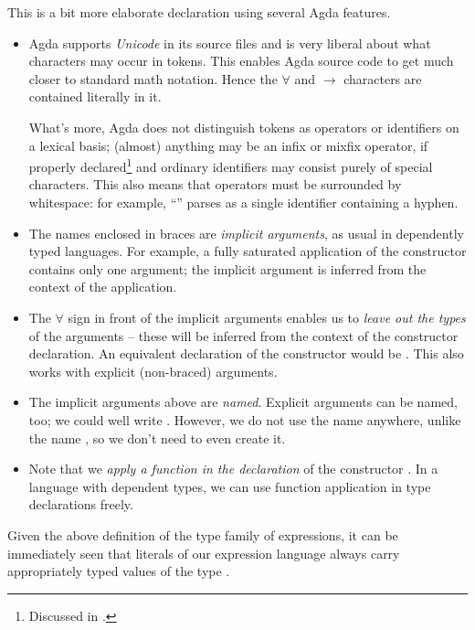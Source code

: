 \noindent This is a bit more elaborate declaration using several Agda features.
\begin{itemize}
	\item Agda supports \emph{Unicode} in its source files and is very liberal about what
		characters may occur in tokens. This enables Agda source code to get much closer
		to standard math notation. Hence the $\forall$ and $\to$ characters
		are contained literally in it.
		
		What's more, Agda does not distinguish tokens as operators or identifiers
		on a lexical basis; (almost) anything may be an infix or mixfix operator,
		if properly declared\footnote{Discussed in .} and ordinary
		identifiers may consist purely of special characters.
		This also means that operators must be surrounded by whitespace: for example,
		``'' parses as a single identifier containing a hyphen.
		
	\item The names enclosed in braces are \emph{implicit arguments}, as usual
		in dependently typed languages. For example, a fully saturated application of the
		constructor  contains only one argument; the implicit argument
		 is inferred from the context of the application.
		
	\item The $\forall$ sign in front of the implicit arguments enables us to \emph{leave
		out the types} of the arguments -- these will be inferred from the context of
		the constructor declaration. An equivalent declaration of the constructor 
		would be .
		This also works with explicit (non-braced) arguments.

	\item The implicit arguments above are \emph{named}. Explicit arguments can be named, too;
		we could well write .
		However, we do not use the name  anywhere, unlike the name ,
		so we don't need to even create it.
		
	\item Note that we \emph{apply a function in the declaration} of the constructor
		. In a language with dependent types, we can use function application
		in type declarations freely.
\end{itemize}

Given the above definition of the type family of expressions, it can be immediately seen that
literals of our expression language always carry appropriately typed values of the
type .

